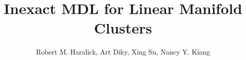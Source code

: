 \documentclass[12pt]{article}
\title{\Large \bf Inexact MDL for Linear Manifold Clusters}
\author{Robert M. Haralick, Art Diky, Xing Su, Nancy Y. Kiang}
\makeatletter
\newif \ifIEEEtran \@ifclassloaded{IEEEtran} {\IEEEtrantrue} {\IEEEtranfalse}
\makeatother
\begin{document}
\maketitle
\tableofcontents
\ifIEEEtran
\else


\fi





\newpage
\begin{appendices}
\renewcommand{\thesubsection}{\Alph{subsection}}
\newpage
\newpage
\end{appendices}
\end{document}
